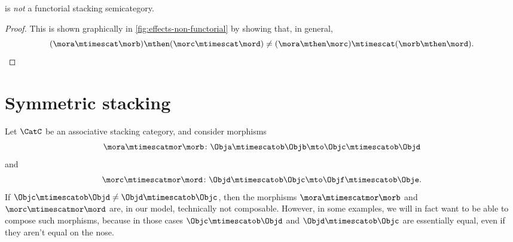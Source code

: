 \begin{lemma}
    \Effects is \emph{not} a functorial stacking semicategory.
\end{lemma}

\begin{proof}
    This is shown graphically in \cref{fig:effects-non-functorial} by showing that, in general,
    \begin{equation*}
        (\mora \mtimescat \morb )
        \mthen (\morc \mtimescat \mord )
        \neq
        (\mora \mthen \morc ) \mtimescat (\morb \mthen \mord ).
    \end{equation*}
\end{proof}

\begin{figure*}[b]
    \centering
    \caption{Proof that \Effects is not a functorial stacking category by showing that
        the two morphisms above have different representations in \SetL.}
    \label{fig:effects-non-functorial}
\end{figure*}

\section{Symmetric stacking}

Let $\CatC$ be an associative stacking category, and consider morphisms
\begin{equation*}
    \mora \mtimescatmor \morb \colon \Obja \mtimescatob \Objb \mto \Objc \mtimescatob \Objd
\end{equation*}
and~
\begin{equation*}
    \morc \mtimescatmor \mord \colon \Objd \mtimescatob \Objc \mto \Objf \mtimescatob \Obje.
\end{equation*}
If $\Objc \mtimescatob \Objd \neq \Objd \mtimescatob \Objc$, then the morphisms $\mora \mtimescatmor \morb$ and $\morc \mtimescatmor \mord$ are, in our model, technically not composable.
However, in some examples, we will in fact want to be able to compose such morphisms, because in those cases $\Objc \mtimescatob \Objd$ and $\Objd \mtimescatob \Objc$ are essentially equal, even if they aren't equal on the nose.

